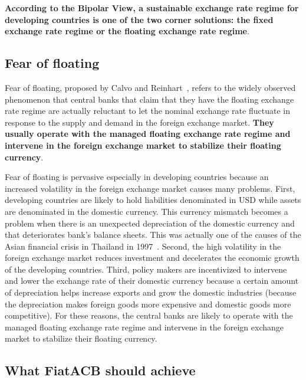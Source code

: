 \documentclass[dvipdfmx,a4paper]{article}
\begin{document}
\textbf{According to the Bipolar View, a sustainable exchange rate regime for developing countries is one of the two corner solutions: the fixed exchange rate regime or the floating exchange rate regime}.

\subsection{Fear of floating}

Fear of floating, proposed by Calvo and Reinhart~\cite{calvo2002fear}, refers to the widely observed phenomenon that central banks that claim that they have the floating exchange rate regime are actually reluctant to let the nominal exchange rate fluctuate in response to the supply and demand in the foreign exchange market. \textbf{They usually operate with the managed floating exchange rate regime and intervene in the foreign exchange market to stabilize their floating currency}.

Fear of floating is pervasive especially in developing countries because an increased volatility in the foreign exchange market causes many problems. First, developing countries are likely to hold liabilities denominated in USD while assets are denominated in the domestic currency. This currency mismatch becomes a problem when there is an unexpected depreciation of the domestic currency and that deteriorates bank's balance sheets. This was actually one of the causes of the Asian financial crisis in Thailand in 1997~\cite{radelet1998east}. Second, the high volatility in the foreign exchange market reduces investment and decelerates the economic growth of the developing countries. Third, policy makers are incentivized to intervene and lower the exchange rate of their domestic currency because a certain amount of depreciation helps increase exports and grow the domestic industries (because the depreciation makes foreign goods more expensive and domestic goods more competitive). For these reasons, the central banks are likely to operate with the managed floating exchange rate regime and intervene in the foreign exchange market to stabilize their floating currency.

\subsection{What FiatACB should achieve}
\end{document}
